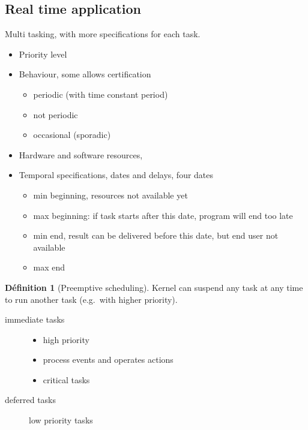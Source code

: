 \documentclass[10pt]{article}
\theoremstyle{plain}
\theoremstyle{definition}
\newtheorem{defn}{Définition}
\theoremstyle{remark}
\begin{document}
\subsection{Real time application}
Multi tasking, with more specifications for each task.
\begin{itemize}
    \item Priority level
    \item Behaviour, some allows certification
        \begin{itemize}
            \item periodic (with time constant period)
            \item not periodic
            \item occasional (sporadic)
        \end{itemize}
    \item Hardware and software resources,
    \item Temporal specifications, dates and delays, four dates
        \begin{itemize}
            \item min beginning, resources not available yet
            \item max beginning: if task starts after this date, program
                will end too late
            \item min end, result can be delivered before this date, but end
                user not available
            \item max end
        \end{itemize}
\end{itemize}

\begin{defn}[Preemptive scheduling]
    Kernel can suspend any task at any time to run another task (e.g.\ with
    higher priority).
\end{defn}

\begin{description}
    \item[immediate tasks]
        \begin{itemize}
            \item high priority
            \item process events and operates actions
            \item critical tasks
        \end{itemize}
    \item[deferred tasks]
        low priority tasks
\end{description}
\end{document}
